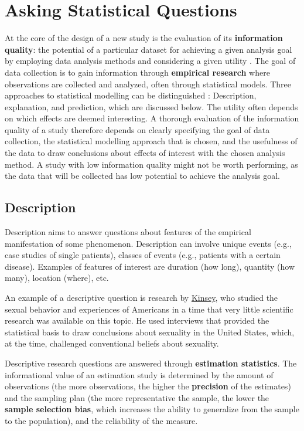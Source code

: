 \documentclass[
  oneside]{krantz}
\begin{document}
\hypertarget{questions}{%
\chapter{Asking Statistical Questions}\label{questions}}

At the core of the design of a new study is the evaluation of its \textbf{information quality}: the potential of a particular dataset for achieving a given analysis goal by employing data analysis methods and considering a given utility
\citep{kenett_information_2016}. The goal of data collection is to gain information through \textbf{empirical research} where observations are collected and analyzed, often through statistical models. Three approaches to statistical modelling can be distinguished \citet{shmueli_explain_2010}: Description, explanation, and prediction, which are discussed below. The utility often depends on which effects are deemed interesting. A thorough evaluation of the information quality of a study therefore depends on clearly specifying the goal of data collection, the statistical modelling approach that is chosen, and the usefulness of the data to draw conclusions about effects of interest with the chosen analysis method. A study with low information quality might not be worth performing, as the data that will be collected has low potential to achieve the analysis goal.

\hypertarget{description}{%
\section{Description}\label{description}}

Description aims to answer questions about features of the empirical manifestation of some phenomenon. Description can involve unique events (e.g., case studies of single patients), classes of events (e.g., patients with a certain disease). Examples of features of interest are duration (how long), quantity (how many), location (where), etc.

An example of a descriptive question is research by \href{https://en.wikipedia.org/wiki/Kinsey_Reports}{Kinsey}, who studied the sexual behavior and experiences of Americans in a time that very little scientific research was available on this topic. He used interviews that provided the statistical basis to draw conclusions about sexuality in the United States, which, at the time, challenged conventional beliefs about sexuality.

Descriptive research questions are answered through \textbf{estimation statistics}. The informational value of an estimation study is determined by the amount of observations (the more observations, the higher the \textbf{precision} of the estimates) and the sampling plan (the more representative the sample, the lower the \textbf{sample selection bias}, which increases the ability to generalize from the sample to the population), and the reliability of the measure.
\end{document}
